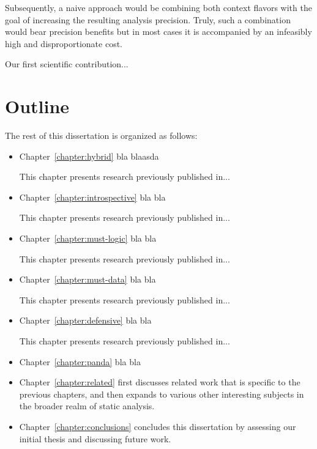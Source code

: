 Subsequently, a naive approach would be combining both context flavors with the goal of increasing the resulting analysis precision. Truly, such a combination would bear precision benefits but in most cases it is accompanied by an infeasibly high and disproportionate cost.

Our first scientific contribution...


\section{Outline}

The rest of this dissertation is organized as follows:
\begin{itemize}%
\item Chapter~\ref{chapter:hybrid} bla blaasda

    This chapter presents research previously published in...

\item Chapter~\ref{chapter:introspective} bla bla

    This chapter presents research previously published in...

\item Chapter~\ref{chapter:must-logic} bla bla

    This chapter presents research previously published in...

\item Chapter~\ref{chapter:must-data} bla bla

    This chapter presents research previously published in...

\item Chapter~\ref{chapter:defensive} bla bla

    This chapter presents research previously published in...
    
\item Chapter~\ref{chapter:panda} bla bla

\item Chapter~\ref{chapter:related} first discusses related work that
  is specific to the previous chapters, and then expands to various
  other interesting subjects in the broader realm of static analysis.

\item Chapter~\ref{chapter:conclusions} concludes this dissertation by assessing our initial thesis and discussing future work.
\end{itemize}